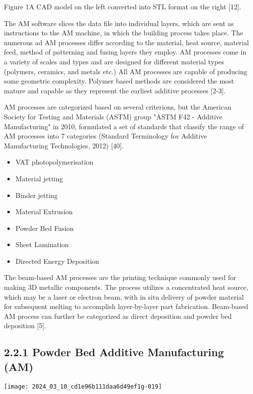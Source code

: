 \documentclass[10pt]{article}
\begin{document}
Figure 1A CAD model on the left converted into STL format on the right [12].

The AM software slices the data file into individual layers, which are sent as instructions to the AM machine, in which the building process takes place. The numerous ad AM processes differ according to the material, heat source, material feed, method of patterning and fusing layers they employ. AM processes come in a variety of scales and types and are designed for different material types (polymers, ceramics, and metals etc.) All AM processes are capable of producing some geometric complexity. Polymer based methods are considered the most mature and capable as they represent the earliest additive processes [2-3].

AM processes are categorized based on several criterions, but the American Society for Testing and Materials (ASTM) group "ASTM F42 - Additive Manufacturing" in 2010, formulated a set of standards that classify the range of AM processes into 7 categories (Standard Terminology for Additive Manufacturing Technologies, 2012) [40].

\begin{itemize}
  \item VAT photopolymerisation

  \item Material jetting

  \item Binder jetting

  \item Material Extrusion

  \item Powder Bed Fusion

  \item Sheet Lamination

  \item Directed Energy Deposition

\end{itemize}

The beam-based AM processes are the printing technique commonly used for making 3D metallic components. The process utilizes a concentrated heat source, which may be a laser or electron beam, with in situ delivery of powder material for subsequent melting to accomplish layer-by-layer part fabrication. Beam-based AM process can further be categorized as direct deposition and powder bed deposition [5].

\subsection*{2.2.1 Powder Bed Additive Manufacturing (AM)}
\begin{center}
\texttt{[image: 2024\_03\_10\_cd1e96b111daa6d49ef1g-019]}
\end{center}
\end{document}
